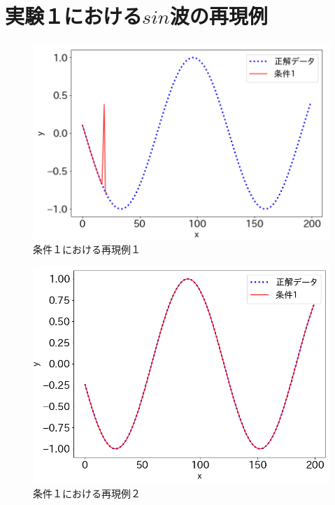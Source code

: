 \chapter{実験１における$sin$波の再現例}

\begin{figure}[ht]
  \begin{center}
    \includegraphics[width=12cm]{./fig/append1}
    \caption{条件１における再現例１}
    \label{fig:append1}
  \end{center}
\end{figure}

\begin{figure}[htp]
  \begin{center}
    \includegraphics[width=12cm]{./fig/append2}
    \caption{条件１における再現例２}
    \label{fig:append2}
  \end{center}
\end{figure}

